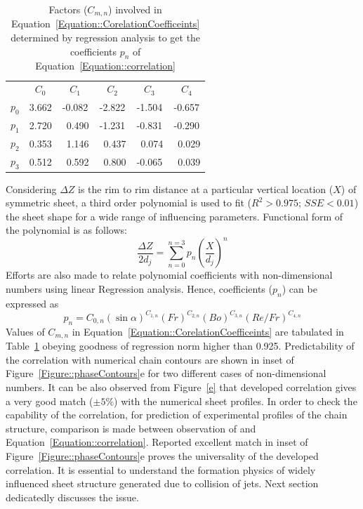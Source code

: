 \documentclass{jfm}
\begin{document}
\begin{table}
	\centering
	\begin{tabular}{@{}cccccc@{}}
		&$C_0$ & $C_1$ & $C_2$ & $C_3$ & $C_4$    \\ 
		$p_0$&3.662&-0.082&-2.822&-1.504&-0.657\\
		$p_1$&2.720&~0.490&-1.231&-0.831&-0.290\\
		$p_2$&0.353&~1.146&~0.437&~0.074&~0.029\\
		$p_3$&0.512&~0.592&~0.800&-0.065&~0.039\\ 
	\end{tabular}
	\caption{Factors ($C_{m,n}$) involved in Equation~\ref{Equation::CorelationCoefficeints} determined by regression analysis to get the coefficients $p_n$ of Equation~\ref{Equation::correlation}}
	\label{Table::CorrelationPrams}
\end{table}
Considering $\Delta Z$ is the rim to rim distance at a particular vertical location ($X$) of symmetric sheet, a third order polynomial is used to fit ($R^2 > 0.975$; $SSE < 0.01$) the sheet shape for a wide range of influencing parameters. Functional form of the polynomial is as follows: 
\begin{equation}\label{Equation::correlation}
\frac{\Delta Z}{2d_j} = \sum_{n = 0}^{n = 3}p_n\left(\frac{X}{d_j}\right)^n
\end{equation}
Efforts are also made to relate polynomial coefficients with non-dimensional numbers using linear Regression analysis. Hence, coefficients ($p_n$) can be expressed as
\begin{equation}\label{Equation::CorelationCoefficeints}
p_n = C_{0,n}\left(\sin\alpha\right)^{C_{1,n}}\left(Fr\right)^{C_{2,n}}\left(Bo\right)^{C_{3,n}}\left(Re/Fr\right)^{C_{4,n}}
\end{equation}
Values of $C_{m,n}$ in Equation~\ref{Equation::CorelationCoefficeints} are tabulated in Table~\ref{Table::CorrelationPrams} obeying goodness of regression norm higher than 0.925. Predictability of the correlation with numerical chain contours are shown in inset of Figure~\ref{Figure::phaseContours}e for two different cases of non-dimensional numbers. It can be also observed from Figure~\ref{e} that developed correlation gives a very good match ($\pm 5\%$) with the numerical sheet profiles. In order to check the capability of the correlation, for prediction of experimental profiles of the chain structure, comparison is made between observation of \cite{bush2004collision} and Equation~\ref{Equation::correlation}. Reported excellent match in inset of Figure~\ref{Figure::phaseContours}e proves the universality of the developed correlation. It is essential to understand the formation physics of widely influenced sheet structure generated due to collision of jets. Next section dedicatedly discusses the issue.
\end{document}
